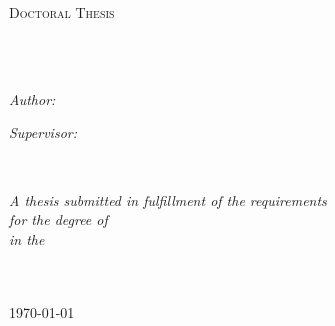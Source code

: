 \documentclass[
11pt, %
english, %
singlespacing, %
headsepline, %
]{MastersDoctoralThesis} %
\author{John \textsc{Smith}} %
\begin{document}
\frontmatter %

\pagestyle{plain} %


\begin{titlepage}
\begin{center}

\vspace*{.06\textheight}
{\scshape\LARGE \univname\par}\vspace{1.5cm} %
\textsc{\Large Doctoral Thesis}\\[0.5cm] %

\HRule \\[0.4cm] %
{\huge \bfseries \ttitle\par}\vspace{0.4cm} %
\HRule \\[1.5cm] %
 
\begin{minipage}[t]{0.4\textwidth}
\begin{flushleft} \large
\emph{Author:}\\
\href{http://www.johnsmith.com}{\authorname} %
\end{flushleft}
\end{minipage}
\begin{minipage}[t]{0.4\textwidth}
\begin{flushright} \large
\emph{Supervisor:} \\
\href{http://www.jamessmith.com}{\supname} %
\end{flushright}
\end{minipage}\\[3cm]
 
\vfill

\large \textit{A thesis submitted in fulfillment of the requirements\\ for the degree of \degreename}\\[0.3cm] %
\textit{in the}\\[0.4cm]
\groupname\\\deptname\\[2cm] %
 
\vfill

{\large \today}\\[4cm] %
 
\vfill
\end{center}
\end{titlepage}
\newpage\null\thispagestyle{empty}\newpage
\end{document}
